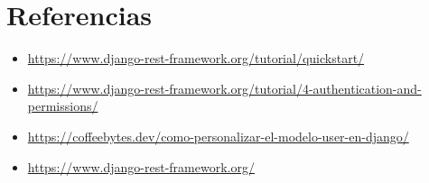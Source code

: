 \documentclass{article}
\begin{document}
\clearpage

\section{Referencias}
\begin{itemize}			
	\item \url{https://www.django-rest-framework.org/tutorial/quickstart/}
	\item \url{https://www.django-rest-framework.org/tutorial/4-authentication-and-permissions/}
 \item \url{https://coffeebytes.dev/como-personalizar-el-modelo-user-en-django/}
 \item \url{https://www.django-rest-framework.org/}
\end{itemize}	
\end{document}
